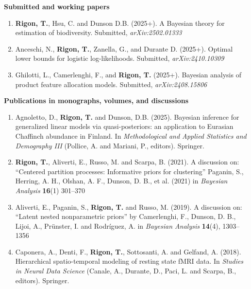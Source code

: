\documentclass[10pt]{article}
\begin{document}
\textbf{Submitted and working papers}
\begin{enumerate}
\setcounter{enumi}{\value{publications}}

\item \textbf{Rigon, T.}, Hsu, C. and Dunson D.B. (2025+). A Bayesian theory for estimation of biodiversity. Submitted, \emph{arXiv:2502.01333}

\item Anceschi, N., \textbf{Rigon, T.}, Zanella, G., and Durante D. (2025+).  Optimal lower bounds for logistic log-likelihoods. Submitted, \emph{arXiv:2410.10309}

\item Ghilotti, L., Camerlenghi, F., and \textbf{Rigon, T.} (2025+). Bayesian analysis of product feature allocation models. Submitted, \emph{arXiv:2408.15806}

\setcounter{publications}{\value{enumi}}
\end{enumerate}

\textbf{Publications in monographs, volumes, and discussions}

\begin{enumerate}
\setcounter{enumi}{\value{publications}}

\item Agnoletto, D., \textbf{Rigon, T.} and Dunson, D.B. (2025). Bayesian inference for generalized linear models via quasi-posteriors: an application to Eurasian Chaffinch abundance in Finland. In \emph{Methodological and Applied Statistics and Demography III} (Pollice, A. and Mariani, P., editors). Springer. 

\item \textbf{Rigon, T.}, Aliverti, E., Russo, M. and Scarpa, B. (2021). A discussion on: ``Centered partition processes: Informative priors for clustering'' Paganin, S., Herring, A. H., Olshan, A. F., Dunson, D. B., et al. (2021) in \textit{Bayesian Analysis} \textbf{16}(1) 301--370

\item Aliverti, E., Paganin, S., \textbf{Rigon, T.} and Russo, M. (2019). A discussion on: ``Latent nested nonparametric priors'' by Camerlenghi, F., Dunson, D. B., Lijoi, A., Pr\"unster, I. and Rodr\'iguez, A. in \textit{Bayesian Analysis} \textbf{14}(4), 1303--1356

\item Caponera, A., Denti, F., \textbf{Rigon, T.}, Sottosanti, A. and Gelfand, A. (2018). Hierarchical spatio-temporal modeling of resting state fMRI data. In \emph{Studies in Neural Data Science} (Canale, A., Durante, D., Paci, L. and Scarpa, B., editors). Springer.
\setcounter{publications}{\value{enumi}}
\end{enumerate}
\end{document}
